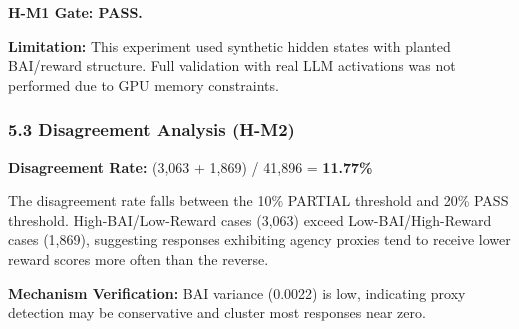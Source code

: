 \textbf{H-M1 Gate: PASS.}

\textbf{Limitation:} This experiment used synthetic hidden states with planted BAI/reward structure. Full validation with real LLM activations was not performed due to GPU memory constraints.

\subsubsection{5.3 Disagreement Analysis (H-M2)}

\begin{table}[htbp]
\centering
{}
\end{table}

\begin{table}[htbp]
\centering
{}
\end{table}

\textbf{Disagreement Rate:} (3,063 + 1,869) / 41,896 = \textbf{11.77\%}

The disagreement rate falls between the 10\% PARTIAL threshold and 20\% PASS threshold. High-BAI/Low-Reward cases (3,063) exceed Low-BAI/High-Reward cases (1,869), suggesting responses exhibiting agency proxies tend to receive lower reward scores more often than the reverse.

\textbf{Mechanism Verification:} BAI variance (0.0022) is low, indicating proxy detection may be conservative and cluster most responses near zero.

